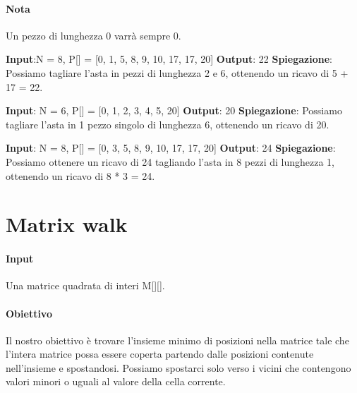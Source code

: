     \paragraph{Nota} Un pezzo di lunghezza 0 varrà sempre 0.
    \begin{esempio}
        \newline
        \textbf{Input}:N = 8, P[] =  [0, 1, 5, 8, 9, 10, 17, 17, 20]
        \newline 
        \textbf{Output}: 22
        \newline
        \textbf{Spiegazione}: Possiamo tagliare l'asta in pezzi di lunghezza 2 e 6, ottenendo un ricavo di 5 + 17 = 22.
    \end{esempio}
    \begin{esempio}
        \newline
        \textbf{Input}: N = 6, P[] =  [0, 1, 2, 3, 4, 5, 20]
        \newline
        \textbf{Output}: 20
        \newline
        \textbf{Spiegazione}: Possiamo tagliare l'asta in 1 pezzo singolo di lunghezza 6, ottenendo un ricavo di 20.
    \end{esempio}
    \begin{esempio}
        \newline
        \textbf{Input}: N = 8, P[] =  [0, 3, 5, 8, 9, 10, 17, 17, 20]
        \newline
        \textbf{Output}: 24
        \newline
        \textbf{Spiegazione}: Possiamo ottenere un ricavo di 24 tagliando l'asta in 8 pezzi di lunghezza 1, ottenendo un ricavo di 8 * 3 = 24.
    \end{esempio}

\newpage
\thispagestyle{chapterInit}
\section*{Matrix walk}
    \paragraph{Input} Una matrice quadrata di interi M[][].
    \paragraph{Obiettivo} Il nostro obiettivo è trovare l'insieme minimo di posizioni nella matrice tale che l'intera matrice possa essere coperta partendo dalle posizioni contenute nell'insieme e spostandosi. Possiamo spostarci solo verso i vicini che contengono valori minori o uguali al valore della cella corrente.
